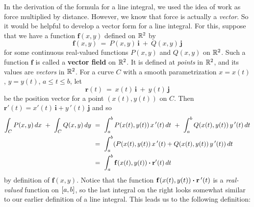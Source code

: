 In the derivation of the formula for a line integral, we used the idea of work as force multiplied by distance.
However, we know that force is actually a \emph{vector}. So it would be helpful to develop a vector form for a
line integral. For this, suppose that we have a function $\mathbf{f}(x,y)$ defined on $\mathbb{R}^{2}$ by
\begin{displaymath}
 \mathbf{f}(x,y) ~=~ P(x,y)\,\mathbf{i} ~+~ Q(x,y)\,\mathbf{j}
\end{displaymath}
for some continuous real-valued functions $P(x,y)$ and $Q(x,y)$ on $\mathbb{R}^{2}$. Such a function $\mathbf{f}$ is called a
\textbf{vector field} on $\mathbb{R}^{2}$. It is defined at \emph{points} in $\mathbb{R}^{2}$, and its values are
\emph{vectors} in $\mathbb{R}^{2}$. For a curve $C$ with a smooth parametrization $x=x(t)$, $y=y(t)$, $a \le t \le b$,
let
\begin{displaymath}
 \mathbf{r}(t) ~=~ x(t)\,\mathbf{i} ~+~ y(t)\,\mathbf{j}
\end{displaymath}
be the position vector for a point $(x(t),y(t))$ on $C$. Then
$\mathbf{r}'(t) = x'(t)\,\mathbf{i} + y\,'(t)\,\mathbf{j}$ and so
\begin{align*}
 \int_C P(x,y)\,dx ~+~ \int_C Q(x,y)\,dy ~&=~ \int_a^b P(x(t),y(t)) \,x\,'(t)\,dt ~+~ \int_a^b Q(x(t),y(t)) \,y\,'(t)\,dt\\
  &=~ \int_a^b (P(x(t),y(t)) \,x\,'(t) + Q(x(t),y(t)) \,y\,'(t))\,dt\\
  &=~ \int_a^b \mathbf{f}(x(t),y(t)) \bm{\cdot} \mathbf{r}'(t)\,dt
\end{align*}
by definition of $\mathbf{f}(x,y)$. Notice that the function $\mathbf{f}(x(t),y(t)) \bm{\cdot} \mathbf{r}\,'(t)$
is a \emph{real-valued} function on $\lbrack a,b \rbrack$, so the last integral on the right looks somewhat similar to our
earlier definition of a line integral. This leads us to the following definition:

